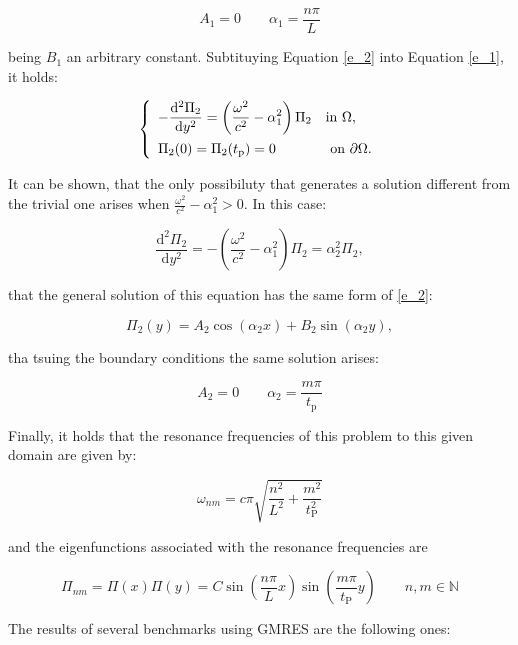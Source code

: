 \documentclass{article}[a4paper, 12pt]
\begin{document}
$$ A_1 = 0 \qquad \alpha_1 = \frac{n\pi}{L} $$

being $B_1$ an arbitrary constant. Subtituying Equation \eqref{e_2} into Equation \eqref{e_1}, it holds:

\begin{equation}\label{e_3}
    \left\{\begin{array} {l l} {\displaystyle -\frac{\mathrm{d}^{2} \Pi_{2}} {\mathrm{d} y^{2}} =\left( \frac{\omega^2} {c^2} - \alpha_1^2 \right) \Pi_{2}  } & {\text{in} ~ \Omega,} \\[2.5ex] {\Pi_2(0)=\Pi_2(t_{\mathrm{p}})=0} & {~ \text{on} ~ \partial\Omega.} \\ \end{array} 
    \right.
\end{equation}

It can be shown, that the only possibiluty that generates a solution different from the trivial one arises when $\displaystyle \frac{\omega^2}{c^2}-\alpha_1^2>0$. In this case:


$$ \frac{\mathrm{d}^{2} \Pi_{2}} {\mathrm{d} y^{2}} = -\left( \frac{\omega^2} {c^2} - \alpha_1^2 \right) \Pi_{2}= \alpha_2^2\Pi_{2},$$

that the general solution of this equation has the same form of \eqref{e_2}:


$$ \Pi_2(y) = A_2\cos(\alpha_2x) + B_2\sin(\alpha_2y), $$

tha tsuing the boundary conditions the same solution arises:

$$ A_2=0 \qquad  \alpha_2 = \frac{m\pi}{t_{\mathrm{p}}} $$

Finally, it holds that the resonance frequencies of this problem to this given domain are given by:

\begin{equation}
    \omega_{nm} = c\pi \sqrt{\frac{n^2}{L^2}+\frac{m^2}{t_\mathrm{P}^2}}
\end{equation}

and the eigenfunctions associated with the resonance frequencies are

\begin{equation}
    \Pi_{nm} = \Pi(x)\Pi(y) = C\sin\left( \frac{n\pi}{L}x \right)\sin\left( \frac{m\pi}{t_\mathrm{P}}y \right) \qquad n,m \in \mathbb{N}
\end{equation}

The results of several benchmarks using GMRES are the following ones:
\end{document}
